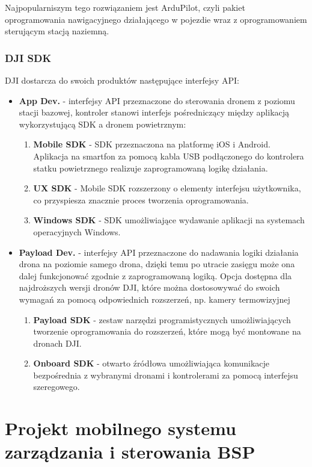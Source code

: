 \hspace{1cm}Najpopularniszym tego rozwiązaniem jest ArduPilot, czyli pakiet oprogramowania nawigacyjnego działającego w pojezdie wraz z oprogramowaniem sterującym stacją naziemną. 

\subsubsection{DJI SDK}
\hspace{1cm}DJI dostarcza do swoich produktów następujące interfejsy API:
\begin{itemize}
  \item \textbf{App Dev.} - interfejsy API przeznaczone do sterowania dronem z poziomu stacji bazowej, kontroler stanowi interfejs pośredniczący między aplikacją wykorzystującą SDK a dronem powietrznym:\begin{enumerate}
    \item \textbf{Mobile SDK} - SDK przeznaczona na platformę iOS i Android. Aplikacja na smartfon za pomocą kabla USB podłączonego do kontrolera statku powietrznego realizuje zaprogramowaną logikę działania.
    \item \textbf{UX SDK} - Mobile SDK rozszerzony o elementy interfejsu użytkownika, co przyspiesza znacznie proces tworzenia oprogramowania.
    \item \textbf{Windows SDK} - SDK umożliwiające wydawanie aplikacji na systemach operacyjnych Windows. 
  \end{enumerate}
  \item \textbf{Payload Dev.} - interfejsy API przeznaczone do nadawania logiki działania drona na poziomie samego drona, dzięki temu po utracie zasięgu może ona dalej funkcjonować zgodnie z zaprogramowaną logiką. Opcja dostępna dla najdroższych wersji dronów DJI, które można dostosowywać do swoich wymagań za pomocą odpowiednich rozszerzeń, np. kamery termowizyjnej\begin{enumerate}
    \item \textbf{Payload SDK} - zestaw narzędzi programistycznych umożliwiających tworzenie oprogramowania do rozszerzeń, które mogą być montowane na dronach DJI. 
    \item \textbf{Onboard SDK} - otwarto źródłowa umożliwiająca komunikacje bezpośrednia z wybranymi dronami i kontrolerami za pomocą interfejsu szeregowego.  
  \end{enumerate}
\end{itemize}

\newpage
\section{Projekt mobilnego systemu zarządzania i sterowania BSP}
